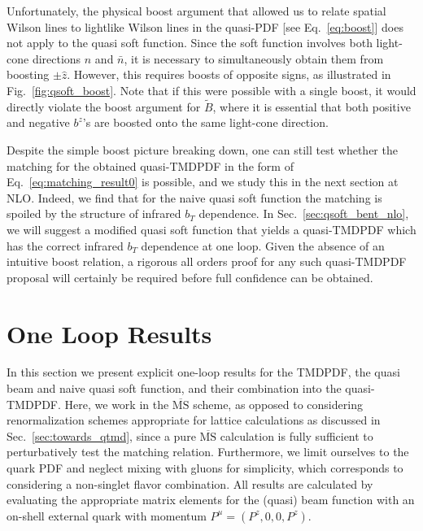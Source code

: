 \documentclass[11pt,a4paper]{article}
\DeclareRobustCommand{\eq}[1]{Eq.~\eqref{eq:#1}}
\DeclareRobustCommand{\fig}[1]{Fig.~\ref{fig:#1}}
\DeclareRobustCommand{\sec}[1]{Sec.~\ref{sec:#1}}
\newcommand{\MS}{\overline{\mathrm{MS}}}
\newcommand{\bn}{{\bar{n}}}
\begin{document}
Unfortunately, the physical boost argument that allowed us to relate spatial Wilson lines to lightlike Wilson lines
in the quasi-PDF [see \eq{boost}] does not apply to the quasi soft function.
Since the soft function involves both light-cone directions $n$ and $\bn$,
it is necessary to simultaneously obtain them from boosting $\pm \hat z$.
However, this requires boosts of opposite signs, as illustrated in \fig{qsoft_boost}.
Note that if this were possible with a single boost, it would directly violate the boost
argument for $\tilde B$, where it is essential that both positive
and negative $b^z$'s are boosted onto the same light-cone direction.

Despite the simple boost picture breaking down, one can still test whether the matching for the obtained quasi-TMDPDF in the form of \eq{matching_result0} is possible, and we study this in the next section at NLO.
Indeed, we find that for the naive quasi soft function the matching is spoiled by the structure of infrared $b_T$ dependence.
In \sec{qsoft_bent_nlo}, we will suggest a modified quasi soft function that yields a quasi-TMDPDF which has the correct infrared $b_T$ dependence at one loop. Given the absence of an intuitive boost relation, a rigorous all orders proof for any such quasi-TMDPDF proposal will certainly be required before full confidence can be obtained.




\section{One Loop Results}
\label{sec:nlo_results}

In this section we present explicit one-loop results for the TMDPDF,
the quasi beam and naive quasi soft function, and their combination into the quasi-TMDPDF.
Here, we work in the $\MS$ scheme, as opposed to considering renormalization schemes appropriate for lattice calculations as discussed in \sec{towards_qtmd}, since a pure $\MS$ calculation is fully sufficient to perturbatively test the matching relation.
Furthermore, we limit ourselves to the quark PDF and neglect mixing with gluons for simplicity, which corresponds to considering a non-singlet flavor combination.
All results are calculated by evaluating the appropriate matrix elements for the (quasi) beam function with an on-shell external quark with momentum $P^\mu = (P^z,0,0,P^z)$.
\end{document}
